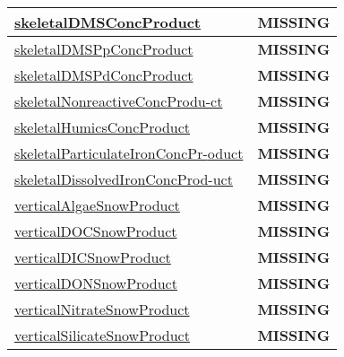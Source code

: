 {\begin{center}
\begin{longtable}{| p{2.0in} | p{4.0in} |}
    \hline
    \hyperref[subsec:var_sec_tracer_products_skeletalDMSConcProduct]{skeletalDMSConcProduct} & {\bf \color{red} MISSING} \\
    \hline
    \hyperref[subsec:var_sec_tracer_products_skeletalDMSPpConcProduct]{skeletalDMSPpConcProduct} & {\bf \color{red} MISSING} \\
    \hline
    \hyperref[subsec:var_sec_tracer_products_skeletalDMSPdConcProduct]{skeletalDMSPdConcProduct} & {\bf \color{red} MISSING} \\
    \hline
    \hyperref[subsec:var_sec_tracer_products_skeletalNonreactiveConcProduct]{skeletalNonreactiveConcProdu-}\hyperref[subsec:var_sec_tracer_products_skeletalNonreactiveConcProduct]{ct  }& {\bf \color{red} MISSING} \\
    \hline
    \hyperref[subsec:var_sec_tracer_products_skeletalHumicsConcProduct]{skeletalHumicsConcProduct} & {\bf \color{red} MISSING} \\
    \hline
    \hyperref[subsec:var_sec_tracer_products_skeletalParticulateIronConcProduct]{skeletalParticulateIronConcPr-}\hyperref[subsec:var_sec_tracer_products_skeletalParticulateIronConcProduct]{oduct  }& {\bf \color{red} MISSING} \\
    \hline
    \hyperref[subsec:var_sec_tracer_products_skeletalDissolvedIronConcProduct]{skeletalDissolvedIronConcProd-}\hyperref[subsec:var_sec_tracer_products_skeletalDissolvedIronConcProduct]{uct  }& {\bf \color{red} MISSING} \\
    \hline
    \hyperref[subsec:var_sec_tracer_products_verticalAlgaeSnowProduct]{verticalAlgaeSnowProduct} & {\bf \color{red} MISSING} \\
    \hline
    \hyperref[subsec:var_sec_tracer_products_verticalDOCSnowProduct]{verticalDOCSnowProduct} & {\bf \color{red} MISSING} \\
    \hline
    \hyperref[subsec:var_sec_tracer_products_verticalDICSnowProduct]{verticalDICSnowProduct} & {\bf \color{red} MISSING} \\
    \hline
    \hyperref[subsec:var_sec_tracer_products_verticalDONSnowProduct]{verticalDONSnowProduct} & {\bf \color{red} MISSING} \\
    \hline
    \hyperref[subsec:var_sec_tracer_products_verticalNitrateSnowProduct]{verticalNitrateSnowProduct} & {\bf \color{red} MISSING} \\
    \hline
    \hyperref[subsec:var_sec_tracer_products_verticalSilicateSnowProduct]{verticalSilicateSnowProduct} & {\bf \color{red} MISSING} \\

\end{longtable}
\end{center}}
